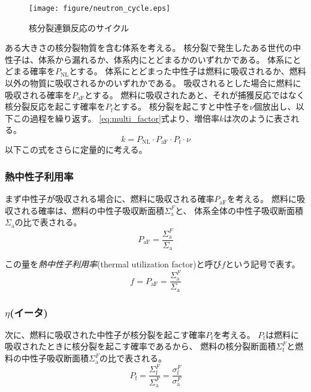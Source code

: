 \begin{figure}[h]
  \centering
  \texttt{[image: figure/neutron\_cycle.eps]}
  \caption{核分裂連鎖反応のサイクル}
  \label{fig:neutron_cycle}
\end{figure}

ある大きさの核分裂物質を含む体系を考える。
核分裂で発生したある世代の中性子は、体系から漏れるか、体系内にとどまるかのいずれかである。
体系にとどまる確率を$P_\text{NL}$とする。
体系にとどまった中性子は燃料に吸収されるか、燃料以外の物質に吸収されるかのいずれかである。
吸収されるとした場合に燃料に吸収される確率を$P_\text{aF}$とする。
燃料に吸収されたあと、それが捕獲反応ではなく核分裂反応を起こす確率を$P_\text{f}$とする。
核分裂を起こすと中性子を$\nu$個放出し、以下この過程を繰り返す。
\ref{eq:multi_factor}式より、増倍率$k$は次のように表される。
\begin{equation}
  k = P_\text{NL} \cdot P_\text{aF} \cdot P_\text{f} \cdot \nu
\end{equation}
以下この式をさらに定量的に考える。

\subsubsection{熱中性子利用率}
まず中性子が吸収される場合に、燃料に吸収される確率$P_\text{aF}$を考える。
燃料に吸収される確率は、燃料の中性子吸収断面積$\Sigma_\text{a}^{F}$と、
体系全体の中性子吸収断面積$\Sigma_\text{a}$の比で表される。
\begin{equation}
  P_\text{aF} = \frac{\Sigma_\text{a}^{F}}{\Sigma_\text{a}}
\end{equation}

この量を\emph{熱中性子利用率}(thermal utilization factor)と呼び$f$という記号で表す。
\begin{equation}
  f = P_\text{aF} = \frac{\Sigma_\text{a}^{F}}{\Sigma_\text{a}}
\end{equation}

\subsubsection{$\eta$(イータ)}
次に、燃料に吸収された中性子が核分裂を起こす確率$P_\text{f}$を考える。
$P_\text{f}$は燃料に吸収されたときに核分裂を起こす確率であるから、
燃料の核分裂断面積$\Sigma_\text{f}^{F}$と燃料の中性子吸収断面積$\Sigma_\text{a}^{F}$の比で表される。
\begin{equation}
  P_\text{f} = \frac{\Sigma_\text{f}^{F}}{\Sigma_\text{a}^{F}}= \frac{\sigma_\text{f}^{F}}{\sigma_\text{a}^{F}}
\end{equation}

